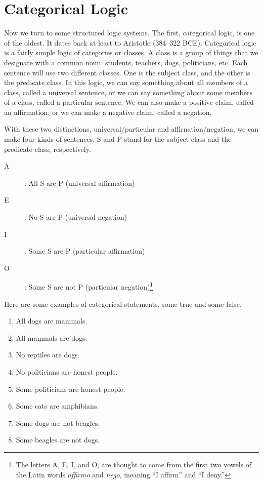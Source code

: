 \documentclass[../logic-text.tex]{subfiles}
\begin{document}
\chapter{Categorical Logic}
\label{chap:categorical}




Now we turn to some structured logic systems. The first, categorical logic, is one of the oldest. It dates back at least to Aristotle (384--322 BCE). Categorical logic is a fairly simple logic of categories or classes. A class is a group of things that we designate with a common noun: students, teachers, dogs, politicians, etc. Each sentence will use two different classes. One is the subject class, and the other is the predicate class. In this logic, we can say something about all members of a class, called a universal sentence, or we can say something about some members of a class, called a particular sentence. We can also make a positive claim, called an affirmation, or we can make a negative claim, called a negation.

With these two distinctions, universal/particular and affirnation/negation, we can make four kinds of sentences. S and P stand for the subject class and the predicate class, respectively.

\begin{description}
\item[A]: All S are P (universal affirmation)
\item[E]: No S are P (universal negation)
\item[I]: Some S are P (particular affirmation)
\item[O]: Some S are not P (particular negation)\footnote{The letters A, E, I, and O, are thought to come from the first two vowels of the Latin words \emph{affirmo} and \emph{nego}, meaning \enquote{I affirm} and \enquote{I deny.}
} 
\end{description}

Here are some examples of categorical statements, some true and some false.

\begin{enumerate}
\item All dogs are mammals.
\item All mammals are dogs.
\item No reptiles are dogs.
\item No politicians are honest people.
\item Some politicians are honest people.
\item Some cats are amphibians.
\item Some dogs are not beagles.
\item Some beagles are not dogs.
\end{enumerate}
\end{document}
